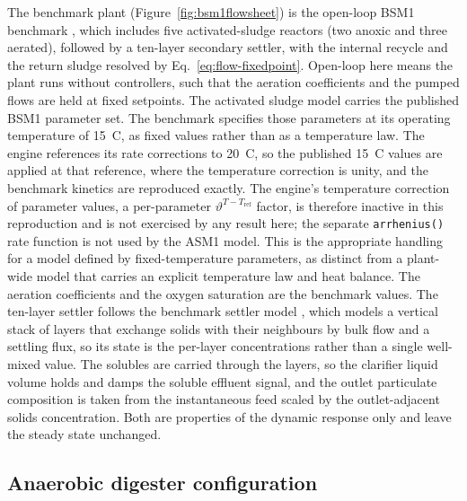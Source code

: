 \documentclass{article}
\begin{document}
The benchmark plant (Figure~\ref{fig:bsm1flowsheet}) is the open-loop BSM1 benchmark \citep{copp2002, alex2008}, which includes five activated-sludge reactors (two anoxic and three aerated), followed by a ten-layer secondary settler, with the internal recycle and the return sludge resolved by Eq.~\eqref{eq:flow-fixedpoint}. Open-loop here means the plant runs without controllers, such that the aeration coefficients and the pumped flows are held at fixed setpoints. The activated sludge model carries the published BSM1 parameter set. The benchmark specifies those parameters at its operating temperature of 15~\textdegree{}C, as fixed values rather than as a temperature law. The engine references its rate corrections to 20~\textdegree{}C, so the published 15~\textdegree{}C values are applied at that reference, where the temperature correction is unity, and the benchmark kinetics are reproduced exactly. The engine's temperature correction of parameter values, a per-parameter \(\vartheta^{T-T_{\mathrm{ref}}}\) factor, is therefore inactive in this reproduction and is not exercised by any result here; the separate \texttt{arrhenius()} rate function is not used by the ASM1 model. This is the appropriate handling for a model defined by fixed-temperature parameters, as distinct from a plant-wide model that carries an explicit temperature law and heat balance. The aeration coefficients and the oxygen saturation are the benchmark values. The ten-layer settler follows the benchmark settler model \citep{takacs1991}, which models a vertical stack of layers that exchange solids with their neighbours by bulk flow and a settling flux, so its state is the per-layer concentrations rather than a single well-mixed value. The solubles are carried through the layers, so the clarifier liquid volume holds and damps the soluble effluent signal, and the outlet particulate composition is taken from the instantaneous feed scaled by the outlet-adjacent solids concentration. Both are properties of the dynamic response only and leave the steady state unchanged.

\subsection{Anaerobic digester configuration}
\label{sec:methods-digesterconfig}
\end{document}
